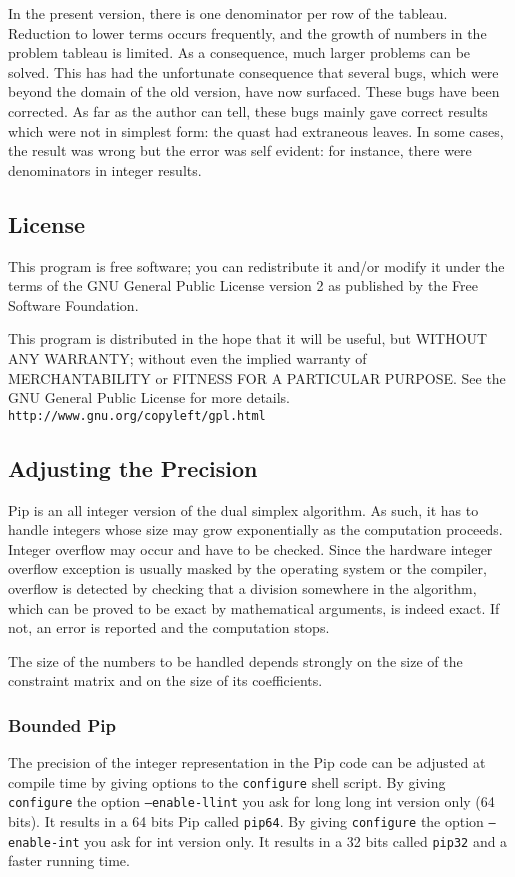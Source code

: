 \documentclass[12pt,a4paper,dvips]{article}
\begin{document}
In the present version, there is one denominator per row of the tableau.
Reduction to lower terms occurs frequently, and the growth of numbers in the
problem tableau is limited. As a consequence, much larger problems can be
solved. This has had the unfortunate consequence that several bugs, which
were beyond the domain of the old version, have now surfaced. These bugs
have been corrected. As far as the author
 can tell, these bugs mainly gave correct
results which were not in simplest form: the quast had extraneous leaves.
In some cases, the result was wrong but the error was self evident: for 
instance, there were denominators in integer results.

\subsection{License}
This program is free software; you can redistribute it and/or
modify it under the terms of the GNU General Public License version 2
as published by the Free Software Foundation.

This program is distributed in the hope that it will be useful,
but WITHOUT ANY WARRANTY; without even the implied warranty of
MERCHANTABILITY or FITNESS FOR A PARTICULAR PURPOSE.  See the
GNU General Public License for more details.
{\tt http://www.gnu.org/copyleft/gpl.html}

\subsection{Adjusting the Precision}
Pip is an all integer  version of the dual simplex algorithm. As such,
it has to handle integers whose size may grow exponentially as the
computation proceeds. Integer overflow may occur and have to be checked.
Since the hardware integer overflow exception is usually masked by
the operating system or the compiler, overflow is detected by checking
that a division somewhere in the algorithm, which can be proved to be
exact by mathematical arguments, is indeed exact. If not, an error is
reported and the computation stops.

The size of the numbers to be handled depends strongly on the size of the
constraint matrix and on the size of its coefficients.

\subsubsection{Bounded Pip}
The precision of the integer representation in the Pip code can be
adjusted at compile time by giving options to the {\tt configure}
shell script.
By giving {\tt configure} the option {\tt --enable-llint} you ask
for long long int version only (64 bits). It results in a 64 bits Pip
called {\tt pip64}.
By giving {\tt configure} the option {\tt --enable-int} you
ask for int version only. It results in a 32 bits called
{\tt pip32} and a faster running time.
\end{document}
